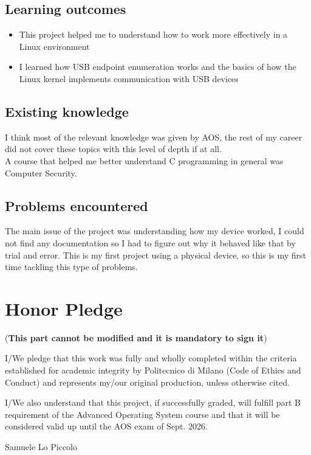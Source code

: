 \documentclass[10pt,a4]{article}
\begin{document}
\subsection{Learning outcomes}
\begin{itemize}
\item This project helped me to understand how to work more effectively in a Linux environment
\item I learned how USB endpoint enumeration works and the basics of how the Linux kernel implements communication with USB devices
\end{itemize}

\subsection{Existing knowledge}
I think most of the relevant knowledge was given by AOS, the rest of my career did not cover these topics with this level of depth if at all.\\
A course that helped me better understand C programming in general was Computer Security.

\subsection{Problems encountered}
The main issue of the project was understanding how my device worked, I could not find any documentation so I had to figure out why it behaved like that by trial and error. This is my first project using a physical device, so this is my first time tackling this type of problems.\\

\section{Honor Pledge}
(\textbf{This part cannot be modified and it is mandatory to sign it})

I/We pledge that this work was fully and wholly completed within the criteria
established for academic integrity by Politecnico di Milano (Code of Ethics and
Conduct) and represents my/our original production, unless otherwise cited.

I/We also understand that this project, if successfully graded,  will fulfill part B requirement of the
Advanced Operating System course and that it will be considered valid up until
the AOS exam of Sept. 2026. 

\begin{flushright}
Samuele Lo Piccolo
\end{flushright}
\end{document}
